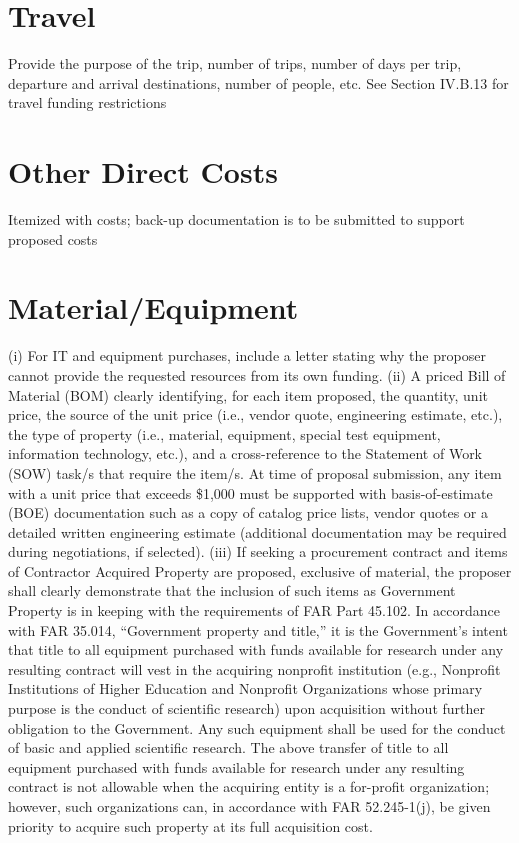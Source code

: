 \section{Travel}
Provide the purpose of the trip, number of trips, number of days per trip, departure and
arrival destinations, number of people, etc. See Section IV.B.13 for travel funding
restrictions
\section{Other Direct Costs}
Itemized with costs; back-up documentation is to be submitted to support proposed costs
\section{Material/Equipment}
(i) For IT and equipment purchases, include a letter stating why the proposer cannot provide
the requested resources from its own funding.
(ii) A priced Bill of Material (BOM) clearly identifying, for each item proposed, the
quantity, unit price, the source of the unit price (i.e., vendor quote, engineering estimate,
etc.), the type of property (i.e., material, equipment, special test equipment, information
technology, etc.), and a cross-reference to the Statement of Work (SOW) task/s that require
the item/s. At time of proposal submission, any item with a unit price that exceeds \$1,000
must be supported with basis-of-estimate (BOE) documentation such as a copy of catalog
price lists, vendor quotes or a detailed written engineering estimate (additional
documentation may be required during negotiations, if selected).
(iii) If seeking a procurement contract and items of Contractor Acquired Property are
proposed, exclusive of material, the proposer shall clearly demonstrate that the inclusion of
such items as Government Property is in keeping with the requirements of FAR Part 45.102.
In accordance with FAR 35.014, “Government property and title,” it is the Government’s
intent that title to all equipment purchased with funds available for research under any
resulting contract will vest in the acquiring nonprofit institution (e.g., Nonprofit Institutions
of Higher Education and Nonprofit Organizations whose primary purpose is the conduct of
scientific research) upon acquisition without further obligation to the Government. Any such
equipment shall be used for the conduct of basic and applied scientific research. The above
transfer of title to all equipment purchased with funds available for research under any
resulting contract is not allowable when the acquiring entity is a for-profit organization;
however, such organizations can, in accordance with FAR 52.245-1(j), be given priority to
acquire such property at its full acquisition cost.
